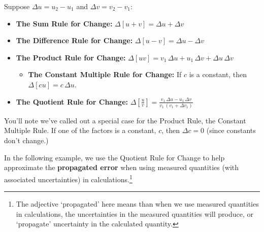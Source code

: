 \documentclass{ximera}
\begin{document}
\begin{theorem}  \label{functionarithmeticchange}  Suppose $\Delta u = u_{2} - u_{1}$ and $\Delta v = v_{2} - v_{1}$:
\begin{itemize}

\item  \textbf{The Sum Rule for Change:}   $\Delta[u+v] = \Delta u + \Delta v$

\item  \textbf{The Difference Rule for Change:}   $\Delta[u - v] = \Delta u - \Delta v$

\item  \textbf{The Product Rule for Change:}  $\Delta[uv]  =  v_{1} \, \Delta u + u_{1} \, \Delta v+  \Delta u \, \Delta v$

\begin{itemize}

\item  \textbf{The Constant Multiple Rule for Change:}  If $c$ is a constant, then $\Delta[c u] = c \,  \Delta u$.

\end{itemize}

\item  \textbf{The Quotient Rule for Change:}  $\Delta\left[ \frac{u}{v} \right] =  \frac{ v_{1} \, \Delta u  - u_{1}  \, \Delta v}{v_{1} \,  (v_{1}  + \Delta v_{1})}$


\end{itemize}

\end{theorem}


You'll note we've called out a special case for the Product Rule, the Constant Multiple Rule.  If one of the factors is a constant, $c$, then $\Delta c = 0$ (since constants don't change.)

In the following example, we use the Quotient Rule for Change to help approximate the \textbf{propagated error} when using measured quantities (with associated uncertainties) in calculations.\footnote{The adjective `propagated' here means than when we use measured quantities in calculations, the uncertainties in the measured quantities will produce, or `propagate' uncertainty in the calculated quantity.}
\end{document}
